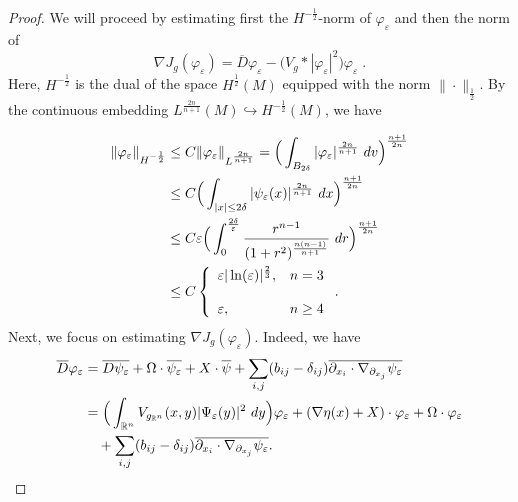 \documentclass[11pt]{article}
\def \R {\mathbb{R}}
\begin{document}
{\begin{proof}
We will proceed by estimating first the $H^{-\frac{1}{2}}$-norm of $\varphi_{\varepsilon}$ and then the norm of 
$$\nabla J_{g}(\varphi_{\varepsilon})=\overline{D}\varphi_{\varepsilon}-\Big(V_{g}*|\varphi_{\varepsilon}|^{2}\Big)\varphi_{\varepsilon}\; .$$ 
Here, $H^{-\frac{1}{2}}$ is the dual of the space $H^{\frac{1}{2}}(M)$ equipped with the norm $\|\cdot \|_{\frac{1}{2}}$. By the continuous embedding $L^{\frac{2n}{n+1}}(M)\hookrightarrow H^{-\frac{1}{2}}(M)$, we have

\begin{align}
\|\varphi_{\varepsilon}\|_{H^{-\frac{1}{2}}}&\leq C \|\varphi_{\varepsilon}\|_{L^{\frac{2n}{n+1}}}=\Big(\int_{B_{2\delta}}|\varphi_{\varepsilon}|^{\frac{2n}{n+1}}\ dv\Big)^{\frac{n+1}{2n}}\notag\\
&\leq C \Big(\int_{|x|\leq 2\delta} |\psi_{\varepsilon}(x)|^{\frac{2n}{n+1}}\ dx \Big)^{\frac{n+1}{2n}}\notag\\
&\leq C\varepsilon\Big(\int_{0}^{\frac{2\delta}{\varepsilon}} \frac{r^{n-1}}{(1+r^{2})^{\frac{n(n-1)}{n+1}}}\ dr \Big)^{\frac{n+1}{2n}} \notag\\
&\leq C\left\{\begin{array}{ll}
\varepsilon |\ln(\varepsilon)|^{\frac{2}{3}}, & n=3\\
\\
\varepsilon, & n\geq 4 
\end{array}
\right..\label{phieps}
\end{align}
Next, we focus on estimating $\nabla J_{g}(\varphi_{\varepsilon})$. Indeed, we have
\begin{align}
\overline{D}\varphi_{\varepsilon}&=\overline{D\psi_{\varepsilon}}+\Omega\cdot \overline{\psi_{\varepsilon}}+X\cdot \overline{\psi}+\sum_{i,j}(b_{ij}-\delta_{ij})\overline{\partial_{x_{i}}\cdot \nabla_{\partial_{x_{j}}}\psi_{\varepsilon}}\notag\\
&=\Big(\int_{\R^{n}}V_{g_{\R^{n}}}(x,y)|\Psi_{\varepsilon}(y)|^{2}\ dy\Big) \varphi_{\varepsilon}+(\nabla\eta(x)+X) \cdot \varphi_{\varepsilon}+\Omega\cdot \varphi_{\varepsilon}\notag\\
&\quad+\sum_{i,j}(b_{ij}-\delta_{ij})\overline{\partial_{x_{i}}\cdot \nabla_{\partial_{x_{j}}}\psi_{\varepsilon}}.\label{decomp}
\end{align}



\end{proof}}
\end{document}
